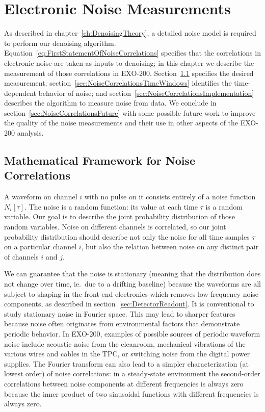 \renewcommand{\thechapter}{5}
\chapter{Electronic Noise Measurements}
\label{ch:NoiseMeasurements}

As described in chapter~\ref{ch:DenoisingTheory}, a detailed noise model is required to perform our denoising algorithm.  Equation~\ref{eq:FirstStatementOfNoiseCorrelations} specifies that the correlations in electronic noise are taken as inputs to denoising; in this chapter we describe the measurement of those correlations in EXO-200.  Section~\ref{sec:NoiseCorrelationsMath} specifies the desired measurement; section~\ref{sec:NoiseCorrelationsTimeWindows} identifies the time-dependent behavior of noise; and section~\ref{sec:NoiseCorrelationsImplementation} describes the algorithm to measure noise from data.  We conclude in section~\ref{sec:NoiseCorrelationsFuture} with some possible future work to improve the quality of the noise measurements and their use in other aspects of the EXO-200 analysis.

\section{Mathematical Framework for Noise Correlations}\label{sec:NoiseCorrelationsMath}

A waveform on channel $i$ with no pulse on it consists entirely of a noise function $N_i[\tau]$.  The noise is a random function:  its value at each time $\tau$ is a random variable.  Our goal is to describe the joint probability distribution of those random variables.  Noise on different channels is correlated, so our joint probability distribution should describe not only the noise for all time samples $\tau$ on a particular channel $i$, but also the relation between noise on any distinct pair of channels $i$ and $j$.

We can guarantee that the noise is stationary (meaning that the distribution does not change over time, ie.~due to a drifting baseline) because the waveforms are all subject to shaping in the front-end electronics which removes low-frequency noise components, as described in section~\ref{sec:DetectorReadout}.  It is conventional to study stationary noise in Fourier space.  This may lead to sharper features because noise often originates from environmental factors that demonstrate periodic behavior. In EXO-200, examples of possible sources of periodic waveform noise include acoustic noise from the cleanroom, mechanical vibrations of the various wires and cables in the TPC, or switching noise from the digital power supplies.  The Fourier transform can also lead to a simpler characterization (at lowest order) of noise correlations: in a steady-state environment the second-order correlations between noise components at different frequencies is always zero because the inner product of two sinusoidal functions with different frequencies is always zero.

